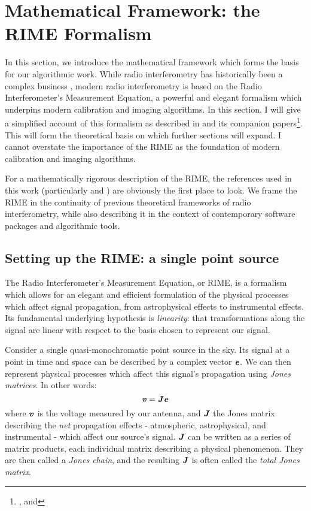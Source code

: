 
\chapter{Mathematical Framework: the RIME Formalism}\label{section.RIME}
\minitoc

\pg
In this section, we introduce the mathematical framework which forms the basis for our algorithmic work.
While radio interferometry has historically been a complex business , modern radio interferometry is based on the Radio Interferometer's Measurement Equation, a powerful and elegant formalism which underpins modern calibration and imaging algorithms. In this section, I will give a simplified account of this formalism as described in  and its companion papers\footnote{,  and }. This will form the theoretical basis on which further sections will expand. I cannot overstate the importance of the RIME as the foundation of modern calibration and imaging algorithms.

\pg
For a mathematically rigorous description of the RIME, the references used in this work (particularly  and ) are obviously the first place to look. We frame the RIME in the continuity of previous theoretical frameworks of radio interferometry, while also describing it in the context of contemporary software packages and algorithmic tools.

\section{Setting up the RIME: a single point source}
\label{section.RIME.setup}

\pg
The Radio Interferometer's Measurement Equation, or RIME, is a formalism which allows for an elegant and efficient formulation of the physical processes which affect signal propagation, from astrophysical effects to instrumental effects. Its fundamental underlying hypothesis is \emph{linearity}: that transformations along the signal are linear with respect to the basis chosen to represent our signal.

\pg
Consider a single quasi-monochromatic point source in the sky. Its signal at a point in time and space can be described by a complex vector $\evector$. We can then represent physical processes which affect this signal's propagation using \emph{Jones matrices}. In other words:
\begin{equation}
\volt = \Jones\evector
\end{equation}
where $\volt$ is the voltage measured by our antenna, and $\Jones$ the Jones matrix describing the \emph{net} propagation effects - atmospheric, astrophysical, and instrumental - which affect our source's signal. $\Jones$ can be written as a series of matrix products, each individual matrix describing a physical phenomenon. They are then called a \emph{Jones chain}, and the resulting $\Jones$ is often called the \emph{total Jones matrix}.


